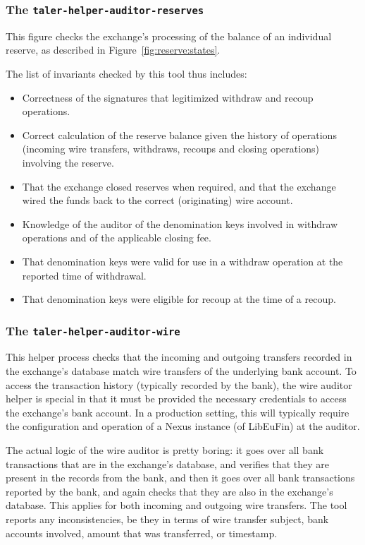 \subsubsection{The \texttt{taler-helper-auditor-reserves}}

This figure checks the exchange's processing of the
balance of an individual reserve, as described
in Figure~\ref{fig:reserve:states}.

The list of invariants checked by this tool thus includes:
\begin{itemize}
\item Correctness of the signatures that legitimized
  withdraw and recoup operations.
\item Correct calculation of the reserve balance given
  the history of operations (incoming wire transfers,
  withdraws, recoups and closing operations)
  involving the reserve.
\item That the exchange closed reserves when required,
  and that the exchange wired the funds back to the
  correct (originating) wire account.
\item Knowledge of the auditor of the denomination keys
  involved in withdraw operations and of the
  applicable closing fee.
\item That denomination keys were valid for use in a
  withdraw operation at the reported time of withdrawal.
\item That denomination keys were eligible for recoup
  at the time of a recoup.
\end{itemize}


\subsubsection{The \texttt{taler-helper-auditor-wire}}

This helper process checks that the incoming and outgoing transfers recorded
in the exchange's database match wire transfers of the underlying bank
account.  To access the transaction history (typically recorded by the bank),
the wire auditor helper is special in that it must be provided the necessary
credentials to access the exchange's bank account.  In a production setting,
this will typically require the configuration and operation of a Nexus
instance (of LibEuFin) at the auditor.

The actual logic of the wire auditor is pretty boring: it goes over all bank
transactions that are in the exchange's database, and verifies that they are
present in the records from the bank, and then it goes over all bank
transactions reported by the bank, and again checks that they are also in the
exchange's database. This applies for both incoming and outgoing wire
transfers.  The tool reports any inconsistencies, be they in terms of wire
transfer subject, bank accounts involved, amount that was transferred, or
timestamp.

